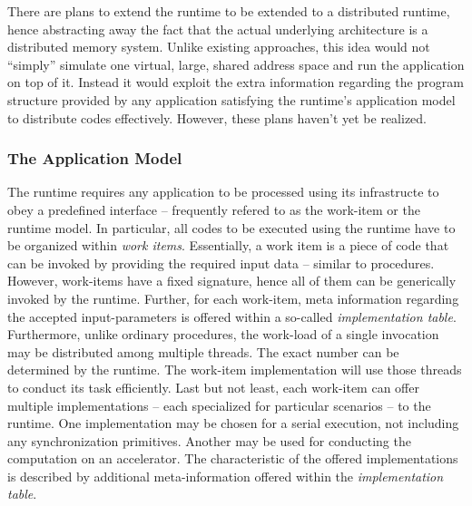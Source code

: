  There
are plans to extend the runtime to be extended to a distributed runtime, hence
abstracting away the fact that the actual underlying architecture is a
distributed memory system. Unlike existing approaches, this idea would not
``simply'' simulate one virtual, large, shared address space and run the
application on top of it. Instead it would exploit the extra information
regarding the program structure provided by any application satisfying the
runtime's application model to distribute codes effectively. However, these
plans haven't yet be realized.


\subsubsection{The Application Model} \label{sec:Overview.Runtime.AppModel}
The runtime requires any application to be processed using its infrastructe to
obey a predefined interface -- frequently refered to as the work-item or the
runtime model. In particular, all codes to be executed using the runtime have to
be organized within \textit{work items}.  Essentially, a work
item is a piece of code that can be invoked by providing the required input data
-- similar to procedures. However, work-items have a fixed signature, hence all
of them can be generically invoked by the runtime. Further, for each work-item,
meta information regarding the accepted input-parameters is offered within a
so-called \textit{implementation table}. Furthermore, unlike ordinary
procedures, the work-load of a single invocation may be distributed among
multiple threads. The exact number can be determined by the runtime. The work-item
implementation will use those threads to conduct its task efficiently. Last but
not least, each work-item can offer multiple implementations -- each specialized
for particular scenarios -- to the runtime. One implementation may be chosen for
a serial execution, not including any synchronization primitives. Another may be
used for conducting the computation on an accelerator. The characteristic of the
offered implementations is described by additional meta-information offered
within the \textit{implementation table}.

